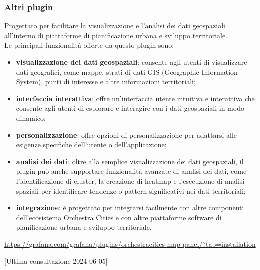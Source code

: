 \subsubsection{Altri plugin}
Progettato per facilitare la visualizzazione e l'analisi dei dati geospaziali all'interno di piattaforme di pianificazione urbana e sviluppo territoriale.\\
Le principali funzionalità offerte da questo plugin sono:
\begin{itemize}
	\item \textbf{visualizzazione dei dati geospaziali}: consente agli utenti di visualizzare dati geografici, come mappe, strati di dati GIS (Geographic Information System), punti di interesse e altre informazioni territoriali;
	\item \textbf{interfaccia interattiva}: offre un'interfaccia utente intuitiva e interattiva che consente agli utenti di esplorare e interagire con i dati geospaziali in modo dinamico;
	\item \textbf{personalizzazione}: offre opzioni di personalizzazione per adattarsi alle esigenze specifiche dell'utente o dell'applicazione;
	\item \textbf{analisi dei dati}: oltre alla semplice visualizzazione dei dati geospaziali, il plugin può anche supportare funzionalità avanzate di analisi dei dati, come l'identificazione di cluster, la creazione di heatmap e l'esecuzione di analisi spaziali per identificare tendenze o pattern significativi nei dati territoriali;
	\item \textbf{integrazione}: è progettato per integrarsi facilmente con altre componenti dell'ecosistema Orchestra Cities e con altre piattaforme software di pianificazione urbana e sviluppo territoriale.
\end{itemize}

\url{https://grafana.com/grafana/plugins/orchestracities-map-panel/?tab=installation}

[Ultima consultazione 2024-06-05]
